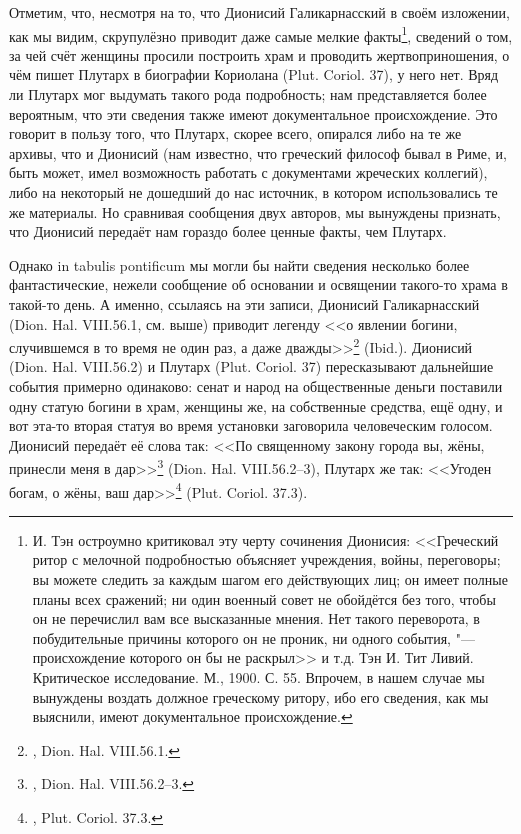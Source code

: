 Отметим, что, несмотря на то, что Дионисий Галикарнасский в своём изложении, как мы видим, скрупулёзно приводит даже самые мелкие факты\footnote{И. Тэн остроумно критиковал эту черту сочинения Дионисия: <<Греческий ритор с мелочной подробностью объясняет учреждения, войны, переговоры; вы можете следить за каждым шагом его действующих лиц; он имеет полные планы всех сражений; ни один военный совет не обойдётся без того, чтобы он не перечислил вам все высказанные мнения. Нет такого переворота, в побудительные причины которого он не проник, ни одного события, "--- происхождение которого он бы не раскрыл>> и т.д. Тэн И. Тит Ливий. Критическое исследование. М., 1900. С. 55. Впрочем, в нашем случае мы вынуждены воздать должное греческому ритору, ибо его сведения, как мы выяснили, имеют документальное происхождение.}, сведений о том, за чей счёт женщины просили построить храм и проводить жертвоприношения, о чём пишет Плутарх в биографии Кориолана (Plut. Coriol. 37), у него нет. Вряд ли Плутарх мог выдумать такого рода подробность; нам представляется более вероятным, что эти сведения также имеют документальное происхождение. Это говорит в пользу того, что Плутарх, скорее всего, опирался либо на те же архивы, что и Дионисий (нам известно, что греческий философ бывал в Риме, и, быть может, имел возможность работать с документами жреческих коллегий), либо на некоторый не дошедший до нас источник, в котором использовались те же материалы. Но сравнивая сообщения двух авторов, мы вынуждены признать, что Дионисий передаёт нам гораздо более ценные факты, чем Плутарх.

Однако in tabulis pontificum мы могли бы найти сведения несколько более фантастические, нежели сообщение об основании и освящении такого-то храма в такой-то день. А именно, ссылаясь на эти записи, Дионисий Галикарнасский (Dion. Hal. VIII.56.1, см. выше) приводит легенду <<о явлении богини, случившемся в то время не один раз, а даже дважды>>\footnote{, Dion. Hal. VIII.56.1.} (Ibid.). Дионисий (Dion. Hal. VIII.56.2) и Плутарх (Plut. Coriol. 37) пересказывают дальнейшие события примерно одинаково: сенат и народ на общественные деньги поставили одну статую богини в храм, женщины же, на собственные средства, ещё одну, и вот эта-то вторая статуя во время установки заговорила человеческим голосом. Дионисий передаёт её слова так: <<По священному закону города вы, жёны, принесли меня в дар>>\footnote{, Dion. Hal. VIII.56.2--3.} (Dion. Hal. VIII.56.2--3), Плутарх же так: <<Угоден богам, о жёны, ваш дар>>\footnote{, Plut. Coriol. 37.3.} (Plut. Coriol. 37.3). 

